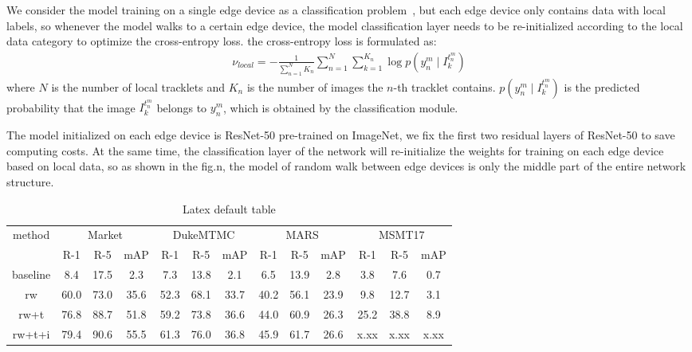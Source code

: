 \documentclass{article}
\begin{document}
We consider the model training on a single edge device as a classification problem~\cite{zheng2016person}, but each edge device only contains data with local labels, so whenever the model walks to a certain edge device, the model classification layer needs to be re-initialized according to the local data category to optimize the cross-entropy loss. the cross-entropy loss is formulated as:
\begin{equation}
\begin{aligned}
    \nu _{local}=-\frac{1}{\sum_{n=1}^{N} K_{n}}\sum_{n=1}^{N}\sum_{k=1}^{K_{n}}\log p(y_{n}^{m}\mid I_{k}^{t_{n}^{m}})
\end{aligned}
\end{equation}
where $N$ is the number of local tracklets and $K_{n}$ is the number of images the $n$-th tracklet contains. $p(y_{n}^{m}\mid I_{k}^{t_{n}^{m}})$ is the predicted probability that the image $I_{k}^{t_{n}^{m}}$ belongs to $y_{n}^{m}$, which is obtained by the classification module.


The model initialized on each edge device is ResNet-50 pre-trained on ImageNet, we fix the first two residual layers of ResNet-50 to save computing costs. At the same time, the classification layer of the network will re-initialize the weights for training on each edge device based on local data, so as shown in the fig.n, the model of random walk between edge devices is only the middle part of the entire network structure.



\renewcommand\arraystretch{1.5}
\begin{table*}
\centering
\begin{tabular}{c|c c c|c c c|c c c|c c c}
\hline
\multirow{2}{*}{method} & 
\multicolumn{3}{c|}{Market} & \multicolumn{3}{c|}{DukeMTMC} & \multicolumn{3}{c|}{MARS} & \multicolumn{3}{c}{MSMT17} \\
\cline{2-13} 
& R-1 & R-5 & mAP & R-1 & R-5 & mAP & R-1 & R-5 & mAP & R-1 & R-5 & mAP\\ \hline
\hline
baseline & 8.4   & 17.5  &  2.3 &  7.3 & 13.8  &  2.1  &  6.5  & 13.9  &  2.8  & 3.8   & 7.6    &  0.7  \\
rw       & 60.0  & 73.0  & 35.6 & 52.3 & 68.1  & 33.7  & 40.2  & 56.1  & 23.9  & 9.8   & 12.7   &  3.1  \\
rw+t     & 76.8  & 88.7  & 51.8 & 59.2 & 73.8  & 36.6  & 44.0  & 60.9  & 26.3  & 25.2  & 38.8   &  8.9  \\
rw+t+i   & 79.4  & 90.6  & 55.5 & 61.3 & 76.0  & 36.8  & 45.9  & 61.7  & 26.6  & x.xx  & x.xx   &  x.xx  \\
\hline
\end{tabular}
\caption{Latex default table}
\label{tab:plain}
\end{table*}
\end{document}
